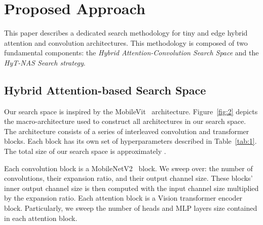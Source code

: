 \documentclass[conference]{IEEEtran}
\begin{document}
\section{Proposed Approach}
\label{sec:approach}
This paper describes a dedicated search methodology for tiny and edge hybrid attention and convolution architectures. This methodology is composed of two fundamental components: the \textit{Hybrid Attention-Convolution Search Space} and the \textit{HyT-NAS Search strategy}.



%
 \vspace{-0.25cm}
\subsection{Hybrid Attention-based Search Space}
\label{sec:search_space}
Our search space is inspired by the MobileVit~\cite{mobilevit} architecture. Figure~\ref{fig:2} depicts the macro-architecture used to construct all architectures in our search space. The architecture consists of a series of interleaved convolution and transformer blocks. Each block has its own set of hyperparameters described in Table~\ref{tab:1}. The total size of our search space is approximately .

Each convolution block is a MobileNetV2~\cite{mobilenetv2} block. We sweep over: the number of convolutions, their expansion ratio, and their output channel size. These blocks' inner output channel size is then computed with the input channel size multiplied by the expansion ratio. Each attention block is a Vision transformer encoder block. Particularly, we sweep the number of heads and MLP layers size contained in each attention block. 
\end{document}
